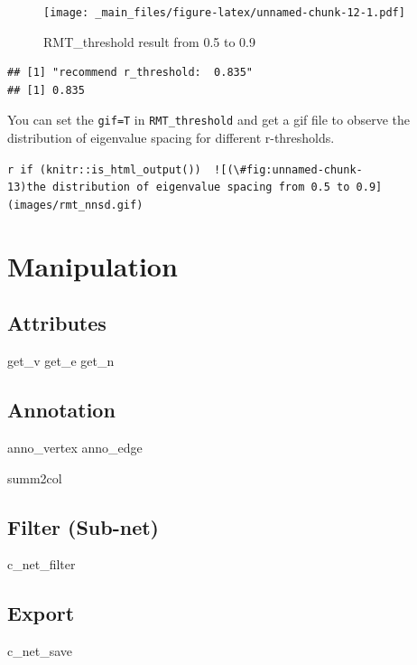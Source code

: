 \documentclass[
]{book}
\begin{document}
\begin{figure}
\centering
\texttt{[image: \_main\_files/figure-latex/unnamed-chunk-12-1.pdf]}
\caption{\label{fig:unnamed-chunk-12}RMT\_threshold result from 0.5 to 0.9}
\end{figure}

\begin{verbatim}
## [1] "recommend r_threshold:  0.835"
## [1] 0.835
\end{verbatim}

You can set the \texttt{gif=T} in \texttt{RMT\_threshold} and get a gif file to observe the distribution of eigenvalue spacing for different r-thresholds.

\texttt{r\ if\ (knitr::is\_html\_output())\ \textquotesingle{}\ !{[}(\textbackslash{}\#fig:unnamed-chunk-13)the\ distribution\ of\ eigenvalue\ spacing\ from\ 0.5\ to\ 0.9{]}(images/rmt\_nnsd.gif)\ \ \textquotesingle{}}

\hypertarget{manipulation}{%
\chapter{Manipulation}\label{manipulation}}

\hypertarget{attributes}{%
\section{Attributes}\label{attributes}}

get\_v
get\_e
get\_n

\hypertarget{annotation}{%
\section{Annotation}\label{annotation}}

anno\_vertex
anno\_edge

summ2col

\hypertarget{filter-sub-net}{%
\section{Filter (Sub-net)}\label{filter-sub-net}}

c\_net\_filter

\hypertarget{export}{%
\section{Export}\label{export}}

c\_net\_save
\end{document}
